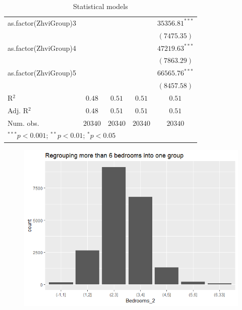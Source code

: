 \documentclass[12pt,a4paper,landscape]{article}
\begin{document}
\begin{table}[H]
\begin{center}
\begin{tabular}{l c c c c}
			as.factor(ZhviGroup)3   &                   &                    &                    & $35356.81^{***}$   \\
			&                   &                    &                    & $(7475.35)$        \\
			as.factor(ZhviGroup)4   &                   &                    &                    & $47219.63^{***}$   \\
			&                   &                    &                    & $(7863.29)$        \\
			as.factor(ZhviGroup)5   &                   &                    &                    & $66565.76^{***}$   \\
			&                   &                    &                    & $(8457.58)$        \\
			\hline
			R$^2$                   & $0.48$            & $0.51$             & $0.51$             & $0.51$             \\
			Adj. R$^2$              & $0.48$            & $0.51$             & $0.51$             & $0.51$             \\
			Num. obs.               & $20340$           & $20340$            & $20340$            & $20340$            \\
			\hline
			\multicolumn{5}{l}{\scriptsize{$^{***}p<0.001$; $^{**}p<0.01$; $^{*}p<0.05$}}
		\end{tabular}
		\caption{Statistical models}
		\label{table:coefficients}
	\end{center}
\end{table}

\begin{figure}[H]
	\centering
	\caption{}
	\label{fig:regrouping-bedrooms}
	\includegraphics[width=0.8\linewidth]{"Regrouping bedrooms"}
\end{figure}
\end{document}

